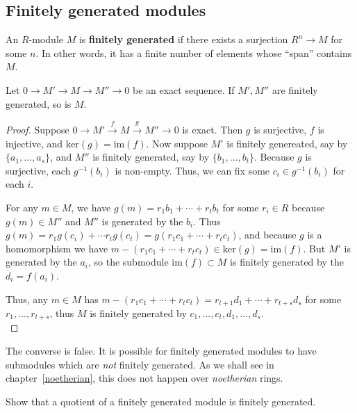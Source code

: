 \subsection{Finitely generated modules}

\begin{definition} 
An $R$-module $M$ is \textbf{finitely generated} if there exists a surjection
$R^n \to M$ for some $n$. In other words, it has a finite number of elements
whose ``span'' contains $M$.
\end{definition} 

\begin{proposition} 
Let $0 \to M' \to M \to M'' \to 0$ be an exact sequence. If $M', M''$ are
finitely generated, so is $M$.
\end{proposition} 
\begin{proof} 
Suppose $0\rightarrow
M'\stackrel{f}{\rightarrow}M\stackrel{g}{\rightarrow}M''\rightarrow0$
is exact. Then $g$ is surjective, $f$ is injective, and
$\text{ker}(g)=\text{im}(f)$. Now suppose $M'$ is finitely genereated,
say by $\{a_1,\ldots,a_s\}$, and $M''$ is finitely generated, say by
$\{b_1,\ldots,b_t\}$. Because $g$ is surjective, each $g^{-1}(b_i)$ is
non-empty. Thus, we can fix some $c_i\in g^{-1}(b_i)$ for each $i$.

For any
$m\in M$, we have $g(m)=r_1b_1+\cdots+r_tb_t$ for some $r_i\in R$ because
$g(m)\in M''$ and $M''$ is generated by the $b_i$. Thus $g(m)=r_1g(c_i)+\cdots
r_tg(c_t)=g(r_1c_1+\cdots+r_tc_t)$, and because $g$ is a homomorphism
we have $m-(r_1c_1+\cdots+r_tc_t)\in\text{ker}(g)=\text{im}(f)$. But
$M'$ is generated by the $a_i$, so the submodule $\text{im}(f)\subset
M$ is finitely generated by the $d_i=f(a_i)$.

Thus, any $m\in
M$ has $m-(r_1c_1+\cdots+r_tc_t)=r_{t+1}d_1+\cdots+r_{t+s}d_s$
for some $r_1,\ldots,r_{t+s}$, thus $M$ is finitely generated by
$c_1,\ldots,c_t,d_1,\ldots,d_s$.  \\

\end{proof} 

The converse is false. It is possible for finitely generated modules to have
submodules which are \emph{not} finitely generated. As we shall see in
chapter~\ref{noetherian}, this does not happen over \emph{noetherian} rings.


\begin{exercise} 
Show that a quotient of a finitely generated module is finitely generated.
\end{exercise} 
